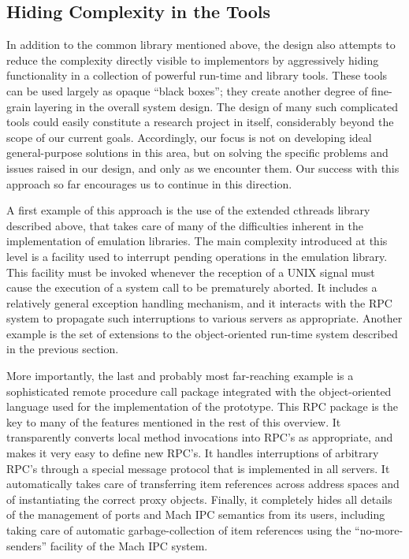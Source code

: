 \subsection{Hiding Complexity in the Tools}

In addition to the common library mentioned above, the design also
attempts to reduce the complexity directly visible to implementors by
aggressively hiding functionality in a collection of powerful run-time
and library tools. These tools can be used largely as opaque ``black
boxes''; they create another degree of fine-grain layering in the
overall system design.  The design of many such complicated tools
could easily constitute a research project in itself, considerably
beyond the scope of our current goals.  Accordingly, our focus is not
on developing ideal general-purpose solutions in this area, but on
solving the specific problems and issues raised in our design, and
only as we encounter them. Our success with this approach so far
encourages us to continue in this direction.

A first example of this approach is the use of the extended cthreads
library described above, that takes care of many of the difficulties
inherent in the implementation of emulation libraries. The main
complexity introduced at this level is a facility used to interrupt
pending operations in the emulation library. This facility must be
invoked whenever the reception of a UNIX signal must cause the
execution of a system call to be prematurely aborted. It includes a
relatively general exception handling mechanism, and it interacts with
the RPC system to propagate such interruptions to various servers as
appropriate. Another example is the set of extensions to the
object-oriented run-time system described in the previous section.

More importantly, the last and probably most far-reaching example is a
sophisticated remote procedure call package integrated with the
object-oriented language used for the implementation of the prototype.
This RPC package is the key to many of the features mentioned in the
rest of this overview. It transparently converts local method
invocations into RPC's as appropriate, and makes it very easy to
define new RPC's. It handles interruptions of arbitrary RPC's through
a special message protocol that is implemented in all servers.  It
automatically takes care of transferring item references across
address spaces and of instantiating the correct proxy objects.
Finally, it completely hides all details of the management of ports
and Mach IPC semantics from its users, including taking care of
automatic garbage-collection of item references using the
``no-more-senders'' facility of the Mach IPC system.

